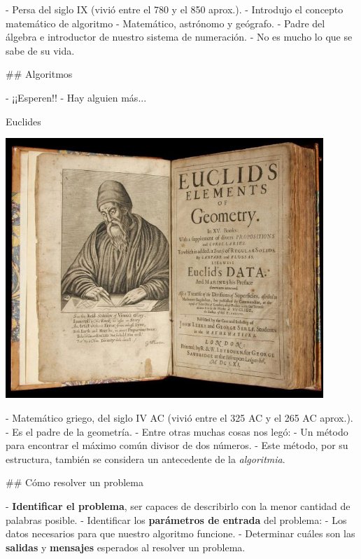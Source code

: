 - Persa del siglo IX (vivió entre el 780 y el 850 aprox.).
- Introdujo el concepto matemático de algoritmo
- Matemático, astrónomo y geógrafo. 
- Padre del álgebra e introductor de nuestro sistema de numeración.
- No es mucho lo que se sabe de su vida.

## Algoritmos

\bgncolumns
{}
\vspace{-1em}

- ¡¡Esperen!!
- Hay alguien más...

\pause

\bgnblockgood[wd=.8\textwidth]
Euclides
\trmblockgood

\includegraphics[width=0.9\textwidth,valign=t]{img/euclid-elements.jpg}
\trmcolumns

- Matemático griego, del siglo IV AC (vivió entre el 325 AC y el 265 AC aprox.).
- Es el padre de la geometría.
- Entre otras muchas cosas nos legó:
    - Un método para encontrar el máximo común divisor de dos números.
    - Este método, por su estructura, también se considera un antecedente de la \textit{algoritmia}.


## Cómo resolver un problema


\vfill

- \textbf{Identificar el problema}, ser capaces de describirlo con la menor cantidad de palabras posible.
- Identificar los \textbf{parámetros de entrada} del problema:
    - Los datos necesarios para que nuestro algoritmo funcione.
- Determinar cuáles son las \textbf{salidas} y \textbf{mensajes} esperados al
resolver un problema.


